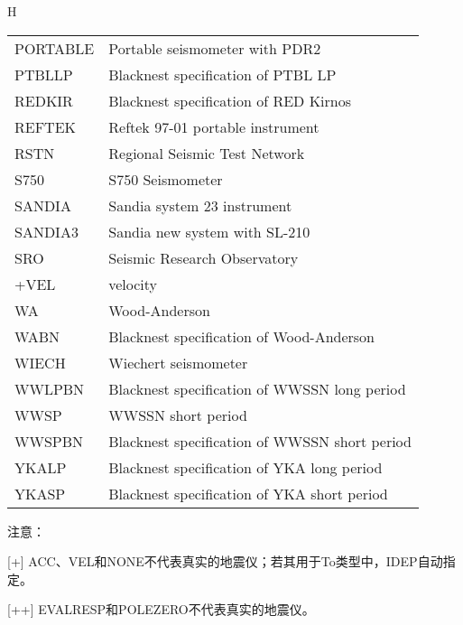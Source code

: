 \begin{table}{H}
\begin{tabular}{ll}
PORTABLE  & Portable seismometer with PDR2	\\
PTBLLP    & Blacknest specification of PTBL LP	\\
REDKIR   &  Blacknest specification of RED Kirnos	\\	
REFTEK   &  Reftek 97-01 portable instrument	\\
RSTN     &  Regional Seismic Test Network	\\
S750     &  S750 Seismometer	\\
SANDIA   &  Sandia system 23 instrument	\\
SANDIA3  &  Sandia new system with SL-210	\\
SRO      &  Seismic Research Observatory	\\
+VEL     &  velocity	\\
WA       &  Wood-Anderson	\\	
WABN     &  Blacknest specification of Wood-Anderson	\\
WIECH    &  Wiechert seismometer	\\
WWLPBN   &  Blacknest specification of WWSSN long period	\\
WWSP     &  WWSSN short period	\\
WWSPBN   &  Blacknest specification of WWSSN short period	\\
YKALP    &  Blacknest specification of YKA long period	\\
YKASP    &  Blacknest specification of YKA short period	\\
\bottomrule
\end{tabular}
\end{table}
注意：

  [+] ACC、VEL和NONE不代表真实的地震仪；若其用于To类型中，IDEP自动指定。

  [++] EVALRESP和POLEZERO不代表真实的地震仪。


